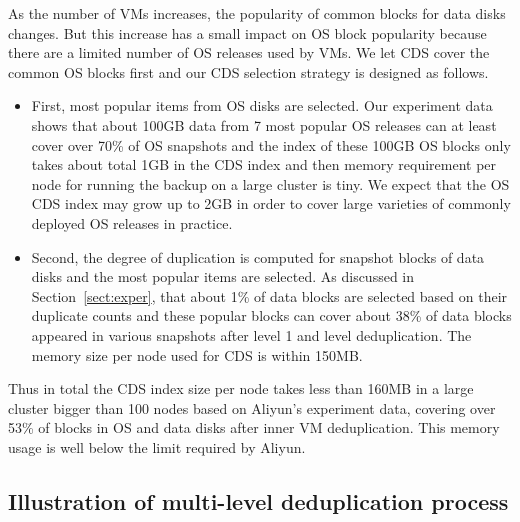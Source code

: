 
As the number of VMs increases, the popularity of common blocks for data disks changes.
But this increase has a small impact on OS block popularity because 
there are a limited number of OS releases used by VMs. We let CDS cover the common OS blocks first and
our CDS selection strategy is designed as follows.
\begin{itemize}
\item First, most popular items from OS disks are selected.
Our experiment data shows that about 
100GB data from 7 most popular OS releases
can at least cover over 70\% of OS snapshots and the index of these 100GB OS blocks
only takes about total 1GB in the CDS index and then memory requirement per node for running the backup
on  a large cluster is tiny.
We expect that the OS CDS index may grow up to 2GB in order to cover large varieties  of commonly deployed
OS releases in practice.
\item Second, the degree of duplication is computed for snapshot blocks of data disks and
the  most popular items are selected. As discussed in Section~\ref{sect:exper}, 
that about 1\% of data blocks are selected based on their duplicate counts and these popular blocks
can cover about 38\% of data  blocks appeared in various snapshots after level 1 and level deduplication.  
The memory size per node used for CDS is within 150MB.
\end{itemize}
Thus in total the CDS index size per node takes less than 160MB in a large cluster bigger than 100 nodes based on
Aliyun's experiment data, covering over 53\% of blocks in OS and data disks after inner VM deduplication.
This memory usage is well below the limit required by Aliyun.


\subsection{Illustration  of multi-level deduplication process}


